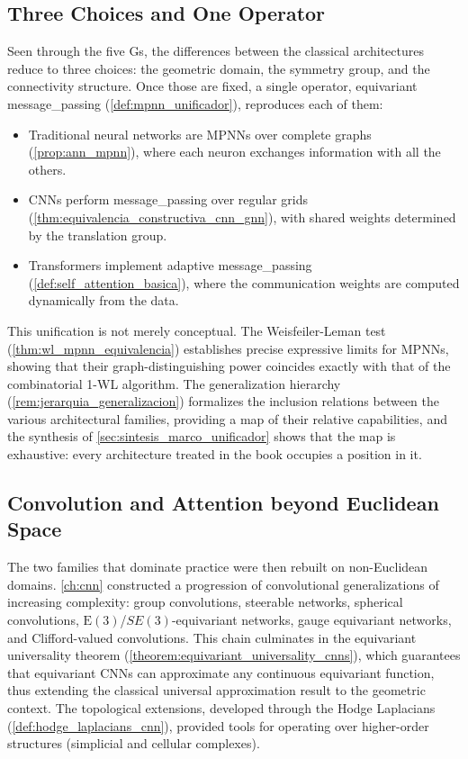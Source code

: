 \subsection{Three Choices and One Operator}

Seen through the five Gs, the differences between the classical architectures reduce to three choices: the geometric domain, the symmetry group, and the connectivity structure. Once those are fixed, a single operator, equivariant \gls{message_passing} (\autoref{def:mpnn_unificador}), reproduces each of them:

\begin{itemize}
	\item Traditional neural networks are \glspl{MPNN} over complete graphs (\autoref{prop:ann_mpnn}), where each neuron exchanges information with all the others.
	\item \glspl{CNN} perform \gls{message_passing} over regular grids (\autoref{thm:equivalencia_constructiva_cnn_gnn}), with shared weights determined by the translation group.
	\item \glspl{Transformer} implement adaptive \gls{message_passing} (\autoref{def:self_attention_basica}), where the communication weights are computed dynamically from the data.
\end{itemize}

This unification is not merely conceptual. The Weisfeiler-Leman test (\autoref{thm:wl_mpnn_equivalencia}) establishes precise expressive limits for \glspl{MPNN}, showing that their graph-distinguishing power coincides exactly with that of the combinatorial 1-WL algorithm. The generalization hierarchy (\autoref{rem:jerarquia_generalizacion}) formalizes the inclusion relations between the various architectural families, providing a map of their relative capabilities, and the synthesis of \autoref{sec:sintesis_marco_unificador} shows that the map is exhaustive: every architecture treated in the book occupies a position in it.

\subsection{Convolution and Attention beyond Euclidean Space}

The two families that dominate practice were then rebuilt on non-Euclidean domains. \autoref{ch:cnn} constructed a progression of convolutional generalizations of increasing complexity: group convolutions, steerable networks, spherical convolutions, $\text{E}(3)$/$SE(3)$-equivariant networks, gauge equivariant networks, and Clifford-valued convolutions. This chain culminates in the equivariant universality theorem (\autoref{theorem:equivariant_universality_cnns}), which guarantees that equivariant \glspl{CNN} can approximate any continuous equivariant function, thus extending the classical universal approximation result to the geometric context. The topological extensions, developed through the Hodge Laplacians (\autoref{def:hodge_laplacians_cnn}), provided tools for operating over higher-order structures (simplicial and cellular complexes).

